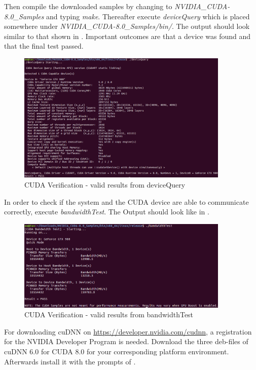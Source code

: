 Then compile the downloaded samples by changing to \textit{NVIDIA_CUDA-8.0_Samples} and typing \textit{make}. 
Thereafter execute \textit{deviceQuery} which is placed somewhere under \textit{NVIDIA_CUDA-8.0_Samples/bin/}. The output should look similar to that shown in . Important outcomes are that a device was found and that the final test passed.

\begin{figure}[htbp]
\centering
\includegraphics[width=0.9\textwidth]{includes/GPUdeviceQuery}
\caption[CUDA Verification - valid results from deviceQuery]{CUDA Verification - valid results from deviceQuery}
\label{fig:GPUdeviceQuery}
\end{figure}

In order to check if the system and the CUDA device are able to communicate correctly, execute \textit{bandwidthTest}. The Output should look like in .

\begin{figure}[htbp]
\centering
\includegraphics[width=0.9\textwidth]{includes/GPUBandwidth}
\caption[CUDA Verification - valid results from bandwidthTest]{CUDA Verification - valid results from bandwidthTest}
\label{fig:GPUBandwidth}
\end{figure}

For downloading cuDNN on \url{https://developer.nvidia.com/cudnn}, a registration for the NVIDIA Developer Program is needed. Download the three deb-files of cuDNN 6.0 for CUDA 8.0 for your corresponding platform environment. Afterwards install it with the prompts of .

